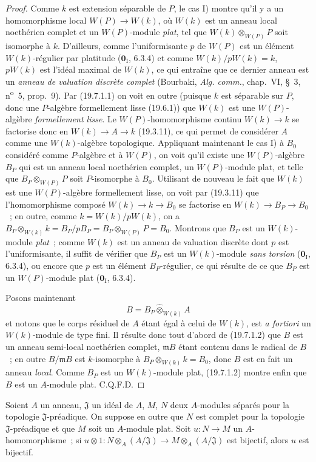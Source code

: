 \begin{proof}
Comme $k$ est extension séparable de $P$, le cas I) montre qu'il y a un
homomorphisme local $W(P)\to W(k)$, où $W(k)$ est un anneau local noethérien
complet et un $W(P)$-module \emph{plat}, tel que $W(k)\otimes_{W(P)}P$ soit isomorphe
à $k$. D'ailleurs, comme l'uniformisante $p$ de $W(P)$ est un élément
$W(k)$-régulier par platitude ($\mathbf 0_{\mathrm I}$, 6.3.4) et comme
$W(k)/pW(k)=k$, $pW(k)$ est l'idéal maximal de $W(k)$, ce qui entraîne que ce
dernier anneau est un \emph{anneau de valuation discrète complet} (Bourbaki,
\emph{Alg. comm.}, chap.~VI, §~3, n\textsuperscript{o}~5, prop.~9). Par
(19.7.1.1) on voit en outre (puisque $k$ est séparable sur $P$, donc une
$P$-algèbre formellement lisse (19.6.1)) que $W(k)$ est une $W(P)$-algèbre
\emph{formellement lisse}. Le $W(P)$-homomorphisme continu $W(k)\to k$ se
factorise donc en $W(k)\to A\to k$ (19.3.11), ce qui permet de considérer $A$
comme une $W(k)$-algèbre topologique. Appliquant maintenant le cas I) à $B_0$
considéré comme $P$-algèbre et à $W(P)$, on voit qu'il existe une
$W(P)$-algèbre $B_P$ qui est un anneau local noethérien complet, un
$W(P)$-module plat, et telle que $B_P\otimes_{W(P)}P$ soit $P$-isomorphe à
$B_0$. Utilisant de nouveau le fait que $W(k)$ est une $W(P)$-algèbre
formellement lisse, on voit par (19.3.11) que l'homomorphisme composé
$W(k)\to k\to B_0$ se factorise en $W(k)\to B_P\to B_0$~; en outre, comme
$k=W(k)/pW(k)$, on a
$B_P\otimes_{W(k)}k=B_P/pB_P=B_P\otimes_{W(P)}P=B_0$. Montrons que $B_P$ est
un $W(k)$-module \emph{plat}~; comme $W(k)$ est un anneau de valuation discrète
dont $p$ est l'uniformisante, il suffit de vérifier que $B_P$ est un
$W(k)$-module \emph{sans torsion} ($\mathbf 0_{\mathrm I}$, 6.3.4), ou encore
que $p$ est un élément $B_P$-régulier, ce qui résulte de ce que $B_P$ est un
$W(P)$-module plat ($\mathbf 0_{\mathrm I}$, 6.3.4).

Posons maintenant
\[
  B=B_P\widehat\otimes_{W(k)}A
\]
et notons que le corps résiduel de $A$ étant égal à celui de $W(k)$, est
\emph{a fortiori} un $W(k)$-module de type fini. Il résulte donc tout d'abord
de (19.7.1.2) que $B$ est un anneau semi-local noethérien complet,
$\mathfrak mB$ étant contenu dans le radical de $B$~; en outre
$B/\mathfrak mB$ est $k$-isomorphe à
$B_P\otimes_{W(k)}k=B_0$, donc $B$ est en fait un anneau \emph{local}. Comme $B_P$
est un $W(k)$-module plat, (19.7.1.2) montre enfin que $B$ est un $A$-module
plat. C.Q.F.D.
\end{proof}

\begin{lemma}[19.7.1.4]
\label{0.19.7.1.4-fr}
Soient $A$ un anneau, $\mathfrak J$ un idéal de $A$, $M$, $N$ deux $A$-modules
séparés pour la topologie $\mathfrak J$-préadique. On suppose en outre que $N$
est complet pour la topologie $\mathfrak J$-préadique et que $M$ soit un
$A$-module plat. Soit $u:N\to M$ un $A$-homomorphisme~; si
$u\otimes1:N\otimes_A(A/\mathfrak J)\to M\otimes_A(A/\mathfrak J)$ est
bijectif, alors $u$ est bijectif.
\end{lemma}


